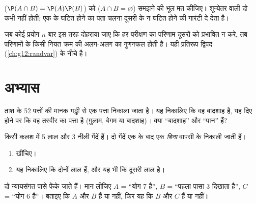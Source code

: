 \begin{remark}
\emph{} ($\P(A\cap B) = \P(A)\P(B)$) को \emph{} ($A \cap B = \varnothing$) समझने की भूल मत कीजिए। शून्येतर
 वाली दो   कभी  नहीं होतीं: एक के घटित होने का
पता चलना दूसरी के न घटित होने की गारंटी दे देता है।
\end{remark}

\begin{definition}[स्वतंत्र पुनरावृत्तियाँ]\label{def:g12:condprob:repet}
जब कोई प्रयोग $n$ बार इस तरह दोहराया जाए कि हर परीक्षण का परिणाम दूसरों को
प्रभावित न करे, तब परिणामों के किसी नियत क्रम की  अलग-अलग
 का गुणनफल होती है। यही प्रतिरूप द्विपद  (\cref{ch:g12:randvar}) के नीचे है।
\end{definition}

\section{अभ्यास}

\begin{exercise}[$\star$]\label{exo:g12:condprob:1}
ताश के 52 पत्तों की मानक गड्डी से एक पत्ता निकाला जाता है। यह 
निकालिए कि वह बादशाह है, यह दिए होने पर कि वह तस्वीर का पत्ता है (ग़ुलाम,
बेगम या बादशाह)। क्या  ``बादशाह'' और ``पान''  हैं?
\end{exercise}

\begin{exercise}[$\star$]\label{exo:g12:condprob:2}
किसी कलश में 5 लाल और 3 नीली गेंदें हैं। दो गेंदें एक के बाद एक \emph{बिना}
वापसी के निकाली जाती हैं।
\begin{enumerate}
  \item {}  खींचिए।
  \item यह  निकालिए कि दोनों लाल हैं, और यह भी कि दूसरी लाल है।
\end{enumerate}
\end{exercise}

\begin{exercise}[$\star$]\label{exo:g12:condprob:3}
दो न्यायसंगत पासे फेंके जाते हैं। मान लीजिए $A$ = ``योग $7$ है'', $B$ =
``पहला पासा $3$ दिखाता है'', $C$ = ``योग $6$ है''। बताइए कि $A$ और $B$
 हैं या नहीं, फिर यह कि $B$ और $C$  हैं या नहीं।
\end{exercise}

